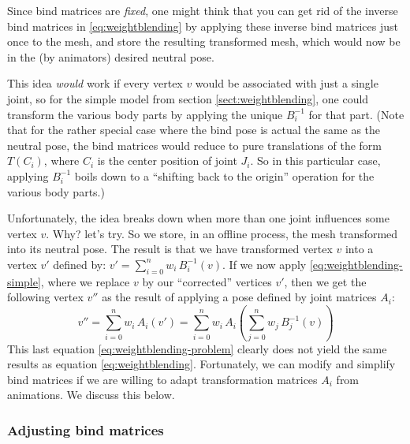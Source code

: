Since bind matrices are \emph{fixed}, one might think that you can get rid of the inverse bind matrices
in \autoref{eq:weightblending} by applying these inverse bind matrices just once to the mesh, and
store the resulting transformed mesh, which would now be in the (by animators) desired neutral pose.

\noindent
This idea \emph{would} work if every vertex $v$ would be associated with just a single joint, so for the simple
model from section \ref{sect:weightblending}, one could transform the various body parts by applying
the unique $B_i^{-1}$ for that part. (Note that for the rather special case where the bind pose
is actual the same as the neutral pose, the bind matrices would reduce to  pure translations of the
form $T(C_i)$, where $C_i$ is the center position of joint $J_i$. So in this particular case,
applying $B_i^{-1}$ boils down to a ``shifting back to the origin'' operation for the various body parts.)

\noindent
Unfortunately, the idea breaks down when more than one joint influences some vertex $v$.
Why? let's try. So we store, in an offline process, the mesh transformed into its neutral pose.
The result is that we have transformed vertex $v$ into a vertex $v'$ defined by:
$ v' = \sum_{i=0}^{n} w_i\, B_i^{-1}(v)$.
If we now apply \autoref{eq:weightblending-simple}, where we replace $v$ by our ``corrected'' vertices $v'$,
then we get the following vertex $v''$ as the result of applying a pose defined by joint matrices $A_i$:
%
\begin{equation}\label{eq:weightblending-problem}
 v'' = \sum_{i=0}^{n} w_i\, A_i(v') = \sum_{i=0}^{n} w_i\, A_i(\sum_{j=0}^{n} w_j\, B_j^{-1}(v))
\end{equation}
%
This last equation \ref{eq:weightblending-problem} clearly does not yield the
same results as equation \ref{eq:weightblending}.
Fortunately, we can modify and simplify bind matrices if we are willing to adapt transformation matrices
$A_i$ from animations. We discuss this below.



\subsubsection{Adjusting bind matrices}

